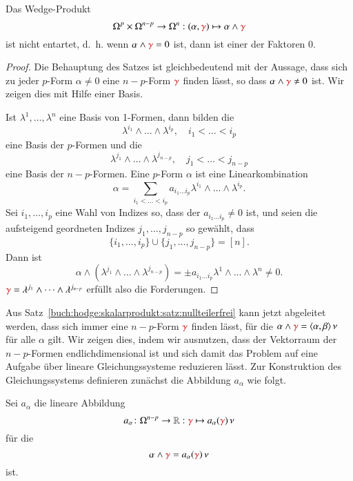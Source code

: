 \begin{satz}
\label{buch:hodge:skalarprodukt:satz:nullteilerfrei}
Das Wedge-Produkt
\[
\Omega^p \times \Omega^{n-p}
\to
\Omega^n
:
(\alpha,{\color{darkred}\gamma})
\mapsto
\alpha\wedge{\color{darkred}\gamma}
\]
ist nicht entartet, d.~h. wenn $\alpha\wedge{\color{darkred}\gamma}=0$
ist, dann ist einer der Faktoren 0.
\end{satz}

\begin{proof}
Die Behauptung des Satzes ist gleichbedeutend mit der Aussage, dass 
sich zu jeder $p$-Form $\alpha\ne 0$ eine $n-p$-Form ${\color{darkred}\gamma}$
finden lässt, so dass $\alpha\wedge{\color{darkred}\gamma}\ne  0$ ist.
Wir zeigen dies mit Hilfe einer Basis.

Ist $\lambda^1,\dots,\lambda^n$ eine Basis von 1-Formen, dann bilden
die
\[
\lambda^{i_1}\wedge\dots\wedge\lambda^{i_p},\quad i_1<\dots<i_p
\]
eine Basis der $p$-Formen und die
\[
\lambda^{j_1}\wedge\dots\wedge\lambda^{j_{n-p}},\quad j_1<\dots<j_{n-p}
\]
eine Basis der $n-p$-Formen.
Eine $p$-Form $\alpha$ ist eine Linearkombination
\[
\alpha
=
\sum_{i_1<\dots<i_p}
a_{i_1\dots i_p} \lambda^{i_1}\wedge\dots\wedge \lambda^{i_p}.
\]
Sei $i_1,\dots,i_p$ eine Wahl von Indizes so, dass
der $a_{i_1\dots i_p}\ne 0$ ist, und seien die aufsteigend geordneten
Indizes $j_1,\dots,j_{n-p}$ so gewählt, dass
\[
\{i_1,\dots,i_p\}\cup\{j_1,\dots,j_{n-p}\} = [n].
\]
Dann ist
\[
\alpha\wedge(\lambda^{j_1}\wedge\dots\wedge\lambda^{j_{n-p}})
=
\pm
a_{i_1\dots i_p} \lambda^1\wedge\dots\wedge\lambda^n
\ne
0.
\]
${\color{darkred}\gamma}=\lambda^{j_1}\wedge\dots\wedge\lambda^{j_{n-p}}$
erfüllt also die Forderungen.
\end{proof}

Aus Satz~\ref{buch:hodge:skalarprodukt:satz:nullteilerfrei} kann jetzt
abgeleitet werden, dass sich immer eine $n-p$-Form ${\color{darkred}\gamma}$
finden lässt, für die $\alpha\wedge{\color{darkred}\gamma}=
\langle\alpha,\beta\rangle\,\nu$ für alle $\alpha$ gilt.
Wir zeigen dies, indem wir ausnutzen, dass der Vektorraum der
$n-p$-Formen endlichdimensional ist und sich damit das Problem
auf eine Aufgabe über lineare Gleichungssysteme reduzieren lässt.
Zur Konstruktion des Gleichungssystems definieren zunächst die
Abbildung $a_\alpha$ wie folgt.

\begin{definition}
\label{buch:hodge:koordinatenfrei:def:hodgekoordinatenfrei}
Sei $a_\alpha$ die lineare Abbildung
\[
a_\alpha
\colon
\Omega^{n-p}
\to
\mathbb{R}
:
{\color{darkred}\gamma}
\mapsto
a_\alpha({\color{darkred}\gamma})\,\nu
\]
für die
\[
\alpha\wedge{\color{darkred}\gamma}
=
a_\alpha({\color{darkred}\gamma})\,\nu
\]
ist.
\end{definition}

